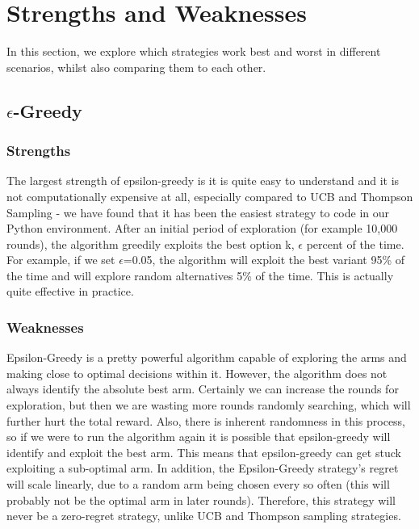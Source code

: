 \section{Strengths and Weaknesses}\label{sec:strengths-and-weaknesses}
In this section, we explore which strategies work best and worst in different scenarios, whilst also comparing them to each other.

\subsection{$\epsilon$-Greedy}\label{subsec:$epsilon$-greedy}

\subsubsection{Strengths}
The largest strength of epsilon-greedy is it is quite easy to understand and it is not computationally expensive at all, especially compared to UCB and Thompson Sampling - we have found that it has been the easiest strategy to code in our Python environment.
After an initial period of exploration (for example 10,000 rounds), the algorithm greedily exploits the best option k, $\epsilon$ percent of the time.
For example, if we set $\epsilon$=0.05, the algorithm will exploit the best variant 95\% of the time and will explore random alternatives 5\% of the time.
This is actually quite effective in practice.

\subsubsection{Weaknesses}
Epsilon-Greedy is a pretty powerful algorithm capable of exploring the arms and making close to optimal decisions within it.
However, the algorithm does not always identify the absolute best arm.
Certainly we can increase the rounds for exploration, but then we are wasting more rounds randomly searching, which will further hurt the total reward.
Also, there is inherent randomness in this process, so if we were to run the algorithm again it is possible that epsilon-greedy will identify and exploit the best arm.
This means that epsilon-greedy can get stuck exploiting a sub-optimal arm.
\newline
In addition, the Epsilon-Greedy strategy's regret will scale linearly, due to a random arm being chosen every so often (this will probably not be the optimal arm in later rounds).
Therefore, this strategy will never be a zero-regret strategy, unlike UCB and Thompson sampling strategies.

